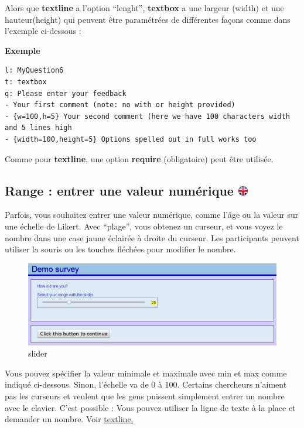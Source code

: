 \documentclass[
]{book}
\begin{document}
Alors que \textbf{textline} a l'option ``lenght'', \textbf{textbox} a une largeur (width) et une hauteur(height) qui peuvent être paramétrées de différentes façons comme dans l'exemple ci-dessous :

\textbf{Exemple}

\begin{verbatim}
l: MyQuestion6
t: textbox
q: Please enter your feedback
- Your first comment (note: no with or height provided)
- {w=100,h=5} Your second comment (here we have 100 characters width and 5 lines high
- {width=100,height=5} Options spelled out in full works too
\end{verbatim}

Comme pour \textbf{textline}, une option \textbf{require} (obligatoire) peut être utilisée.

\hypertarget{range-entrer-une-valeur-numuxe9rique}{%
\subsection[Range : entrer une valeur numérique ]{\texorpdfstring{Range : entrer une valeur numérique \href{https://www.psytoolkit.org/doc3.2.0/online-survey-syntax.html\#range}{\protect\includegraphics{img/ukflag.png}}}{Range : entrer une valeur numérique }}\label{range-entrer-une-valeur-numuxe9rique}}

Parfois, vous souhaitez entrer une valeur numérique, comme l'âge ou la valeur sur une échelle de Likert. Avec ``plage'', vous obtenez un curseur, et vous voyez le nombre dans une case jaune éclairée à droite du curseur. Les participants peuvent utiliser la souris ou les touches fléchées pour modifier le nombre.

\begin{figure}
\centering
\includegraphics{img/slider.png}
\caption{slider}
\end{figure}

Vous pouvez spécifier la valeur minimale et maximale avec min et max comme indiqué ci-dessous. Sinon, l'échelle va de 0 à 100.
Certains chercheurs n'aiment pas les curseurs et veulent que les gens puissent simplement entrer un nombre avec le clavier. C'est possible : Vous pouvez utiliser la ligne de texte à la place et demander un nombre. Voir \protect\hyperlink{textline}{textline.}
\end{document}
